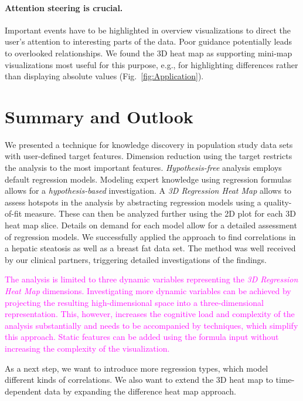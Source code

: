 \documentclass[journal]{style/vgtc} 			          %
\newcommand{\magenta}[1]{\textcolor{magenta}{#1}}
\begin{document}
\paragraph{Attention steering is crucial.}
Important events have to be highlighted in overview visualizations to direct the user's attention to interesting parts of the data.
Poor guidance potentially leads to overlooked relationships.
We found the 3D heat map as supporting mini-map visualizations most useful for this purpose, e.g., for highlighting differences rather than displaying absolute values (Fig.~\ref{fig:Application}).
\section{Summary and Outlook}
We presented a technique for knowledge discovery in population study data sets with user-defined target features.
Dimension reduction using the target restricts the analysis to the most important features.
\emph{Hypothesis-free} analysis employs default regression models.
Modeling expert knowledge using regression formulas allows for a \emph{hypothesis-based} investigation.
A \emph{3D Regression Heat Map} allows to assess hotspots in the analysis by abstracting regression models using a quality-of-fit measure.
These can then be analyzed further using the 2D plot for each 3D heat map slice.
Details on demand for each model allow for a detailed assessment of regression models.
We successfully applied the approach to find correlations in a hepatic steatosis as well as a breast fat data set.
The method was well received by our clinical partners, triggering detailed investigations of the findings.

\magenta{
The analysis is limited to three dynamic variables representing the \emph{3D Regression Heat Map} dimensions.
Investigating more dynamic variables can be achieved by projecting the resulting high-dimensional space into a three-dimensional representation.
This, however, increases the cognitive load and complexity of the analysis substantially and needs to be accompanied by techniques, which simplify this approach.
Static features can be added using the formula input without increasing the complexity of the visualization.
}

As a next step, we want to introduce more regression types, which model different kinds of correlations.
We also want to extend the 3D heat map to time-dependent data by expanding the difference heat map approach.
\end{document}
